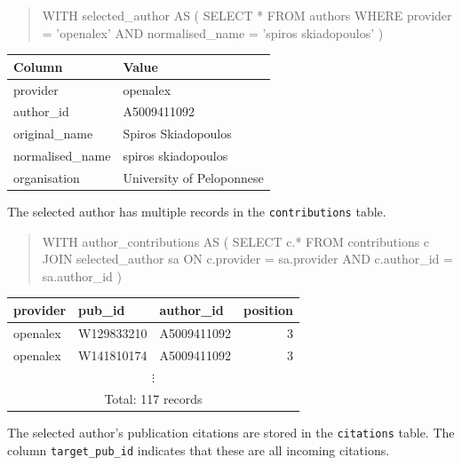 \begin{quote}
    \begin{vercode}
WITH selected_author AS (
    SELECT *
    FROM authors
    WHERE provider = 'openalex'
        AND normalised_name = 'spiros skiadopoulos'
)
    \end{vercode}
\end{quote}

\begin{center}
    \begin{tabular}{|l|l|}
        \hline
        Column & Value \\
        \hline\hline
        provider & openalex \\
        author\_id & A5009411092 \\
        original\_name & Spiros Skiadopoulos \\
        normalised\_name & spiros skiadopoulos \\
        organisation & University of Peloponnese \\
        \hline
    \end{tabular}
\end{center}

The selected author has multiple records in the \texttt{contributions} table.

\begin{quote}
    \begin{vercode}
WITH author_contributions AS (
    SELECT c.*
    FROM contributions c
        JOIN selected_author sa
            ON c.provider = sa.provider
                AND c.author_id = sa.author_id
)
    \end{vercode}
\end{quote}

\begin{center}
    \begin{tabular}{|l|l|l|r|}
        \hline
        provider & pub\_id & author\_id & position \\
        \hline\hline
        openalex & W129833210 & A5009411092 & 3 \\
        openalex & W141810174 & A5009411092 & 3 \\
        \multicolumn{4}{|c|}{$\vdots$} \\
        \multicolumn{4}{|c|}{Total: 117 records} \\
        \hline
    \end{tabular}
\end{center}

The selected author's publication citations are stored in the \texttt{citations} table.
The column \texttt{target\_pub\_id} indicates that these are all incoming citations.

